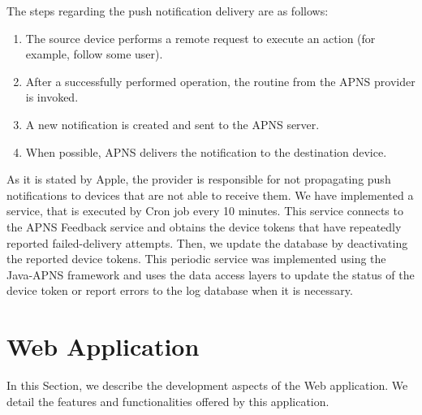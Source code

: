 The steps regarding the push notification delivery are as follows:
\begin{enumerate}
	\item The source device performs a remote request to execute an action (for example, follow some user).
	\item After a successfully performed operation, the routine from the APNS provider is invoked.
	\item A new notification is created and sent to the APNS server. 
	\item When possible, APNS delivers the notification to the destination device.
\end{enumerate}
As it is stated by Apple, the provider is responsible for not propagating push notifications to devices that are not able to receive them. We have implemented a service, that is executed by Cron job every 10 minutes. This service connects to the APNS Feedback service and obtains the device tokens that have repeatedly reported failed-delivery attempts. Then, we update the database by deactivating the reported device tokens. This periodic service was implemented using the Java-APNS framework and uses the data access layers to update the status of the device token or report errors to the log database when it is necessary.
        
\section{Web Application}
\label{sec:mobileApp}
In this Section, we describe the development aspects of the Web application. We detail the features and functionalities offered by this application.
